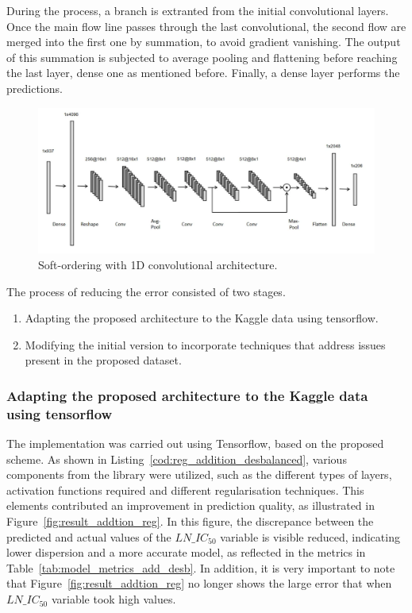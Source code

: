 During the process, a branch is extranted from the initial convolutional layers. Once the main flow line passes through the last convolutional, the second flow are merged into the first one by summation, to avoid gradient vanishing. The output of this summation is subjected to average pooling and flattening before reaching the last layer, dense one as mentioned before. Finally, a dense layer performs the predictions. 

\begin{figure}[H]
    \centering
    \includegraphics[width=1\textwidth]{figures/softOrdering1D.png}
    \caption{Soft-ordering with 1D convolutional architecture.}
    \label{fig:softOrdering1D}
\end{figure}

The process of reducing the error consisted of two stages. 

\begin{enumerate}
    \item Adapting the proposed architecture to the Kaggle data using tensorflow.
    \item Modifying the initial version to incorporate techniques that address issues present in the proposed dataset.
\end{enumerate}

\subsubsection{Adapting the proposed architecture to the Kaggle data using tensorflow}

The implementation was carried out using Tensorflow, based on the proposed scheme. As shown in Listing~\ref{cod:reg_addition_desbalanced}, various components from the library were utilized, such as the different types of layers, activation functions required and different regularisation techniques. This elements contributed an improvement in prediction quality, as illustrated in Figure~\ref{fig:result_addtion_reg}. In this figure, the discrepance between the predicted and actual values of the \(LN\_IC_{50}\) variable is visible reduced, indicating lower dispersion and a more accurate model, as reflected in the metrics in Table~\ref{tab:model_metrics_add_desb}. In addition, it is very important to note that Figure~\ref{fig:result_addtion_reg} no longer shows the large error that when \(LN\_IC_{50}\) variable took high values.

